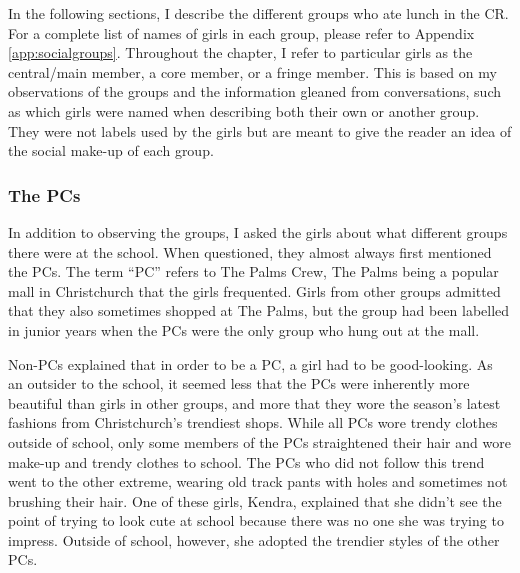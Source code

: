 In the following sections, I describe the different groups who ate lunch in the CR.  For a complete list of names of girls in each group, please refer to Appendix \ref{app:socialgroups}.  Throughout the chapter, I refer to particular girls as the central/main member, a core member, or a fringe member.  This is based on my observations of the groups and the information gleaned from conversations, such as which girls were named when describing both their own or another group.  They were not labels used by the girls but are meant to give the reader an idea of the social make-up of each group.

\subsubsection{The PCs}
In addition to observing the groups, I asked the girls about what different groups there were at the school.  When questioned, they almost always first mentioned the PCs.  The term ``PC'' refers to The Palms Crew, The Palms being a popular mall in Christchurch that the girls frequented.  Girls from other groups admitted that they also sometimes shopped at The Palms, but the group had been labelled in junior years when the PCs were the only group who hung out at the mall.

Non-PCs explained that in order to be a PC, a girl had to be good-looking.  As an outsider to the school, it seemed less that the PCs were inherently more beautiful than girls in other groups, and more that they wore the season's latest fashions from Christchurch's trendiest shops.  While all PCs wore trendy clothes outside of school, only some members of the PCs straightened their hair and wore make-up and trendy clothes to school.  The PCs who did not follow this trend went to the other extreme, wearing old track pants with holes and sometimes not brushing their hair.  One of these girls, Kendra, explained that she didn't see the point of trying to look cute at school because there was no one she was trying to impress.  Outside of school, however, she adopted the trendier styles of the other PCs.  

